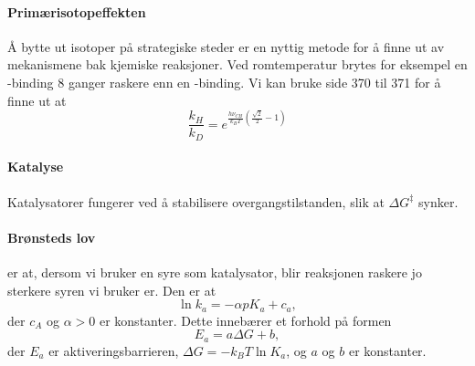 \paragraph{Primærisotopeffekten}
Å bytte ut isotoper på strategiske steder er en nyttig metode for å finne ut av mekanismene bak kjemiske reaksjoner. Ved romtemperatur brytes for eksempel en -binding 8 ganger raskere enn en -binding. Vi kan bruke side 370 til 371 for å finne ut at
\begin{equation}
	\frac{k_H}{k_D}=e^{\frac{h\nu_{CH}}{k_BT}\left(\frac{\sqrt{2}}{2}-1\right)}
\end{equation}

\paragraph{Katalyse} Katalysatorer fungerer ved å stabilisere overgangstilstanden, slik at $\Delta G^\ddag$ synker. 

\paragraph{Brønsteds lov} er at, dersom vi bruker en syre som katalysator, blir reaksjonen raskere jo sterkere syren vi bruker er. Den er at
\begin{equation}
	\ln k_a = -\alpha pK_a + c_a,
\end{equation}
der $c_A$ og $\alpha>0$ er konstanter. Dette innebærer et forhold på formen
\begin{equation}
	E_a=a\Delta G + b,
\end{equation}
der $E_a$ er aktiveringsbarrieren, $\Delta G=-k_BT\ln K_a$, og $a$ og $b$ er konstanter.
